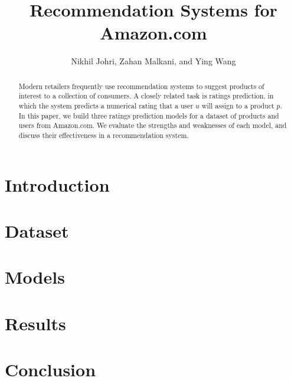 \documentclass[letterpaper, 10 pt, conference]{ieeeconf}
\title{\LARGE \bf
Recommendation Systems for Amazon.com
}
\author{Nikhil Johri, Zahan Malkani, and Ying Wang
}
\begin{document}
\maketitle
\thispagestyle{empty}
\pagestyle{empty}


\begin{abstract}
Modern retailers frequently use recommendation systems to suggest products of 
interest to a collection of consumers. A closely related task is ratings 
prediction, in which the system predicts a numerical rating that a 
user $u$ will assign to a product $p$. In this paper, we build three ratings 
prediction models for a dataset of products and users from Amazon.com. We 
evaluate the strengths and weaknesses of each model, and discuss their 
effectiveness in a recommendation system.

\end{abstract}

\section{Introduction}

\section{Dataset}
\label{sec:dataset}

\section{Models}
\label{sec:models}

\section{Results}
\label{sec:results}

\section{Conclusion}
\end{document}
